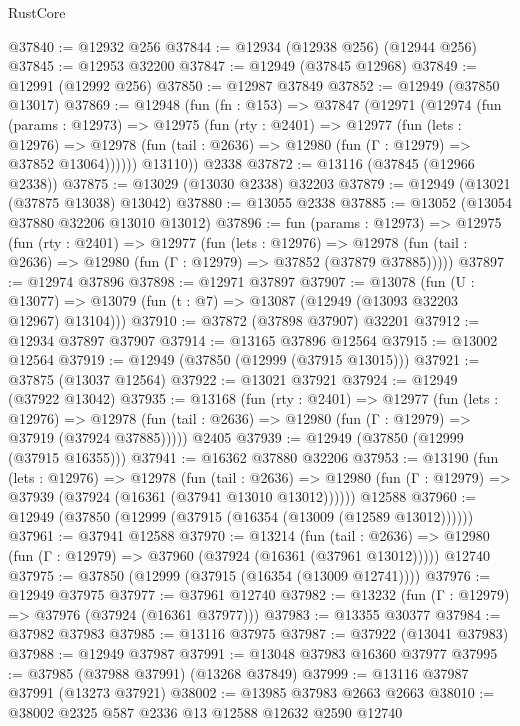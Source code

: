 \begin{lexlean}{RustCore}
\begin{coremodule}
@37840 := @12932 @256
@37844 := @12934 (@12938 @256) (@12944 @256)
@37845 := @12953 @32200
@37847 := @12949 (@37845 @12968)
@37849 := @12991 (@12992 @256)
@37850 := @12987 @37849
@37852 := @12949 (@37850 @13017)
@37869 := @12948
    (fun (fn : @153) =>
    @37847
      (@12971
        (@12974
          (fun (params : @12973) =>
          @12975
            (fun (rty : @2401) =>
            @12977
              (fun (lets : @12976) =>
              @12978 (fun (tail : @2636) => @12980 (fun (Γ : @12979) => @37852 @13064))))))
        @13110))
    @2338
@37872 := @13116 (@37845 (@12966 @2338))
@37875 := @13029 (@13030 @2338) @32203
@37879 := @12949 (@13021 (@37875 @13038) @13042)
@37880 := @13055 @2338
@37885 := @13052 (@13054 @37880 @32206 @13010 @13012)
@37896 := fun (params : @12973) =>
  @12975
    (fun (rty : @2401) =>
    @12977
      (fun (lets : @12976) =>
      @12978 (fun (tail : @2636) => @12980 (fun (Γ : @12979) => @37852 (@37879 @37885)))))
@37897 := @12974 @37896
@37898 := @12971 @37897
@37907 := @13078
    (fun (U : @13077) => @13079 (fun (t : @7) => @13087 (@12949 (@13093 @32203 @12967) @13104)))
@37910 := @37872 (@37898 @37907) @32201
@37912 := @12934 @37897 @37907
@37914 := @13165 @37896 @12564
@37915 := @13002 @12564
@37919 := @12949 (@37850 (@12999 (@37915 @13015)))
@37921 := @37875 (@13037 @12564)
@37922 := @13021 @37921
@37924 := @12949 (@37922 @13042)
@37935 := @13168
    (fun (rty : @2401) =>
    @12977
      (fun (lets : @12976) =>
      @12978 (fun (tail : @2636) => @12980 (fun (Γ : @12979) => @37919 (@37924 @37885)))))
    @2405
@37939 := @12949 (@37850 (@12999 (@37915 @16355)))
@37941 := @16362 @37880 @32206
@37953 := @13190
    (fun (lets : @12976) =>
    @12978
      (fun (tail : @2636) =>
      @12980 (fun (Γ : @12979) => @37939 (@37924 (@16361 (@37941 @13010 @13012))))))
    @12588
@37960 := @12949 (@37850 (@12999 (@37915 (@16354 (@13009 (@12589 @13012))))))
@37961 := @37941 @12588
@37970 := @13214
    (fun (tail : @2636) => @12980 (fun (Γ : @12979) => @37960 (@37924 (@16361 (@37961 @13012)))))
    @12740
@37975 := @37850 (@12999 (@37915 (@16354 (@13009 @12741))))
@37976 := @12949 @37975
@37977 := @37961 @12740
@37982 := @13232 (fun (Γ : @12979) => @37976 (@37924 (@16361 @37977)))
@37983 := @13355 @30377
@37984 := @37982 @37983
@37985 := @13116 @37975
@37987 := @37922 (@13041 @37983)
@37988 := @12949 @37987
@37991 := @13048 @37983 @16360 @37977
@37995 := @37985 (@37988 @37991) (@13268 @37849)
@37999 := @13116 @37987 @37991 (@13273 @37921)
@38002 := @13985 @37983 @2663 @2663
@38010 := @38002 @2325 @587 @2336 @13 @12588 @12632 @2590 @12740

\end{coremodule}
\end{lexlean}
